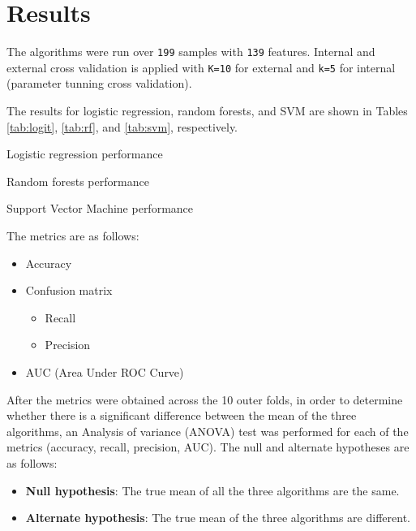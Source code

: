 \section{Results}
The algorithms were run over \texttt{199} samples with \texttt{139} features. Internal and external cross validation is applied with \texttt{K=10} for external and \texttt{k=5} for internal (parameter tunning cross validation).

The results for logistic regression, random forests, and SVM are shown in Tables \ref{tab:logit}, \ref{tab:rf}, and \ref{tab:svm}, respectively.

\begin{table}
	\centering
	\caption{Logistic regression performance}
	\label{tab:logit}
\end{table}

\begin{table}
	\centering
	\caption{Random forests performance}
	\label{tab:rf}
\end{table}

\begin{table}
	\centering
	\caption{Support Vector Machine performance}
	\label{tab:svm}
\end{table}


The metrics are as follows:
\begin{itemize}
	\item Accuracy
	\item Confusion matrix
	\begin{itemize}
		\item Recall
		\item Precision
	\end{itemize}
	\item AUC (Area Under ROC Curve)
\end{itemize}

After the metrics were obtained across the 10 outer folds, in order to determine whether there is a significant difference between the mean of the three algorithms, an Analysis of variance (ANOVA) test was performed for each of the metrics (accuracy, recall, precision, AUC). The null and alternate hypotheses are as follows:
\begin{itemize}
	\item \textbf{Null hypothesis}: The true mean of all the three algorithms are the same.
	\item \textbf{Alternate hypothesis}: The true mean of the three algorithms are different.
\end{itemize}

